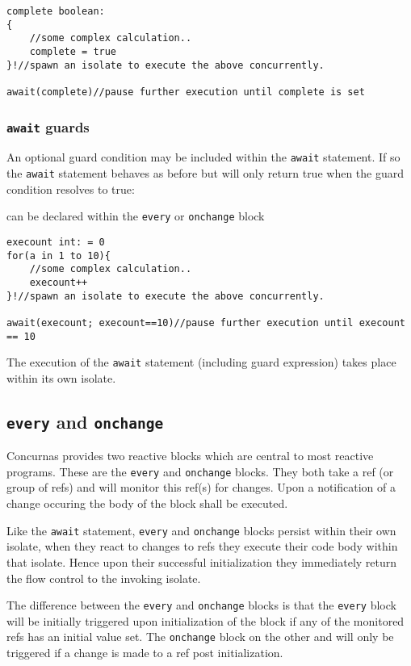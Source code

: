 \documentclass[conc-doc]{subfiles}
\begin{document}
\begin{lstlisting}
complete boolean:
{
	//some complex calculation..
	complete = true
}!//spawn an isolate to execute the above concurrently.

await(complete)//pause further execution until complete is set
\end{lstlisting}

\subsubsection{\lstinline{await} guards}
An optional guard condition may be included within the \lstinline{await} statement. If so the \lstinline{await} statement behaves as before but will only return true when the guard condition resolves to true:

can be declared within the \lstinline{every} or \lstinline{onchange} block
\begin{lstlisting}
execount int: = 0
for(a in 1 to 10){
	//some complex calculation..
	execount++
}!//spawn an isolate to execute the above concurrently.

await(execount; execount==10)//pause further execution until execount == 10
\end{lstlisting}	

The execution of the \lstinline{await} statement (including guard expression) takes place within its own isolate.

\subsection{\lstinline{every} and \lstinline{onchange}}
Concurnas provides two reactive blocks which are central to most reactive programs. These are the \lstinline{every} and \lstinline{onchange} blocks. They both take a ref (or group of refs) and will monitor this ref(s) for changes. Upon a notification of a change occuring the body of the block shall be executed.

Like the \lstinline{await} statement, \lstinline{every} and \lstinline{onchange} blocks persist within their own isolate, when they react to changes to refs they execute their code body within that isolate. Hence upon their successful initialization they immediately return the flow control to the invoking isolate.

The difference between the \lstinline{every} and \lstinline{onchange} blocks is that the \lstinline{every} block will be initially triggered upon initialization of the block if any of the monitored refs has an initial value set. The \lstinline{onchange} block on the other and will only be triggered if a change is made to a ref post initialization.
\end{document}
